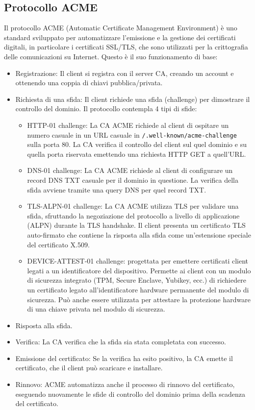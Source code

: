 \documentclass[12pt]{report}
\begin{document}
\subsection{Protocollo ACME}
Il protocollo ACME (Automatic Certificate Management Environment) è uno standard sviluppato per automatizzare l'emissione e la gestione dei certificati digitali, in particolare i certificati SSL/TLS, che sono utilizzati per la crittografia delle comunicazioni su Internet.
Questo è il suo funzionamento di base:
\begin{itemize}
    \item Registrazione: Il client si registra con il server CA, creando un account e ottenendo una coppia di chiavi pubblica/privata.
    \item Richiesta di una sfida: Il client richiede una sfida (challenge) per dimostrare il controllo del dominio. Il protocollo contempla 4 tipi di sfide:
    \begin{itemize}
        \item HTTP-01 challenge: La CA ACME richiede al client di ospitare un numero casuale in un URL casuale in \texttt{/.well-known/acme-challenge} sulla porta 80. La CA verifica il controllo del client sul quel dominio e su quella porta riservata emettendo una richiesta HTTP GET a quell'URL.
        \item DNS-01 challenge: La CA ACME richiede al client di configurare un record DNS TXT casuale per il dominio in questione. La verifica della sfida avviene tramite una query DNS per quel record TXT.
        \item TLS-ALPN-01 challenge: La CA ACME utilizza TLS per validare una sfida, sfruttando la negoziazione del protocollo a livello di applicazione (ALPN) durante la TLS handshake. Il client presenta un certificato TLS auto-firmato che contiene la risposta alla sfida come un'estensione speciale del certificato X.509.
        \item DEVICE-ATTEST-01 challenge: progettata per emettere certificati client legati a un identificatore del dispositivo. Permette ai client con un modulo di sicurezza integrato (TPM, Secure Enclave, Yubikey, ecc.) di richiedere un certificato legato all'identificatore hardware permanente del modulo di sicurezza. Può anche essere utilizzata per attestare la protezione hardware di una chiave privata nel modulo di sicurezza.
    \end{itemize}
    \item Risposta alla sfida.
    \item Verifica: La CA verifica che la sfida sia stata completata con successo.
    \item Emissione del certificato: Se la verifica ha esito positivo, la CA emette il certificato, che il client può scaricare e installare.
    \item Rinnovo: ACME automatizza anche il processo di rinnovo del certificato, eseguendo nuovamente le sfide di controllo del dominio prima della scadenza del certificato.
\end{itemize}
\end{document}
